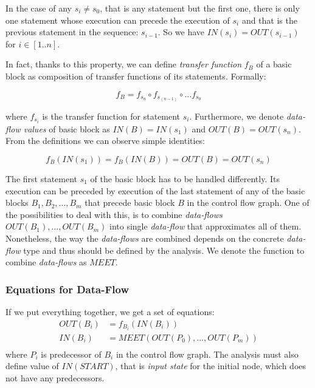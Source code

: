         In the case of any $s_i \neq s_0$, that is any statement but 
        the first one, there is only one statement whose execution 
        can precede the execution of $s_i$ and that is the previous statement 
        in the sequence: $s_{i-1}$. So we have $IN(s_i) = OUT(s_{i-1})$ 
        for $i\in{[1..n]}$. 
        
        In fact, thanks to this property, we can define \emph{transfer function} 
        $f_B$ of a basic block as composition of transfer functions of 
        its statements. Formally: 
        
        \[ f_B = f_{s_n} \circ f_{s_{(n-1)}} \circ ... f_{s_0} \]
        
        where $f_{s_i}$ is the transfer function for statement $s_i$.            
        Furthermore, we denote \emph{data-flow values} of basic block as 
        $IN(B)=IN(s_1)$ and $OUT(B)=OUT(s_n)$. From the definitions we can 
        observe simple identities: 
        
        \[ f_B(IN(s_1))=f_B(IN(B))=OUT(B)=OUT(s_n) \]
        
        The first statement $s_1$ of the basic block has to be 
        handled differently. Its execution can be preceded by 
        execution of the last statement of any of 
        the basic blocks $B_1, B_2, ..., B_m$ that precede basic block 
        $B$ in the control flow graph. One of the possibilities to deal with 
        this, is to combine \emph{data-flows} $OUT(B_1), ..., OUT(B_m)$ into 
        single \emph{data-flow} that approximates all of them. 
        Nonetheless, the way the \emph{data-flows} are combined depends 
        on the concrete \emph{data-flow} type and thus 
        should be defined by the analysis. We denote the function to 
        combine \emph{data-flows} as $\mathit{MEET}$. 
        
        \subsubsection*{Equations for Data-Flow}
        
        If we put everything together, we get a set of equations:
        \begin{align*}
            OUT(B_i) &= f_{B_i}(IN(B_i)) \\
            IN(B_i) &= \mathit{MEET}(OUT(P_0), ..., OUT(P_m)) \\ 
        \end{align*}
        where $P_i$ is predecessor of $B_i$ in the control flow graph. 
        The analysis must also define value of $IN(START)$, that is 
        \emph{input state} for the initial node, which does not have 
        any predecessors.
        
